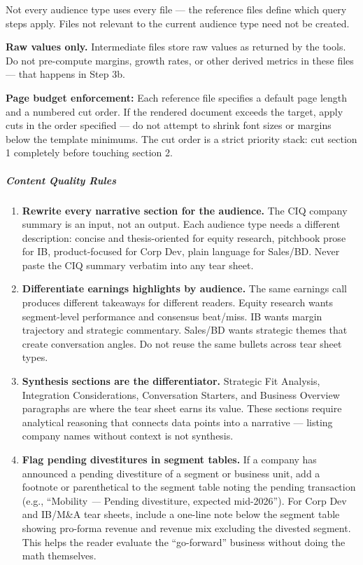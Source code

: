 \documentclass[11pt]{article}
\begin{document}
Not every audience type uses every file — the reference files define which query steps apply. Files not relevant to the current audience type need not be created.


\textbf{Raw values only.} Intermediate files store raw values as returned by the tools. Do not pre-compute margins, growth rates, or other derived metrics in these files — that happens in Step 3b.


\textbf{Page budget enforcement:} Each reference file specifies a default page length and a numbered cut order. If the rendered document exceeds the target, apply cuts in the order specified — do not attempt to shrink font sizes or margins below the template minimums. The cut order is a strict priority stack: cut section 1 completely before touching section 2.


\subparagraph{Content Quality Rules}\mbox{}\par

\begin{enumerate}[leftmargin=*,itemsep=2pt,topsep=2pt]
\item {} \textbf{Rewrite every narrative section for the audience.} The CIQ company summary is an input, not an output. Each audience type needs a different description: concise and thesis-oriented for equity research, pitchbook prose for IB, product-focused for Corp Dev, plain language for Sales/BD. Never paste the CIQ summary verbatim into any tear sheet.
\item {} \textbf{Differentiate earnings highlights by audience.} The same earnings call produces different takeaways for different readers. Equity research wants segment-level performance and consensus beat/miss. IB wants margin trajectory and strategic commentary. Sales/BD wants strategic themes that create conversation angles. Do not reuse the same bullets across tear sheet types.
\item {} \textbf{Synthesis sections are the differentiator.} Strategic Fit Analysis, Integration Considerations, Conversation Starters, and Business Overview paragraphs are where the tear sheet earns its value. These sections require analytical reasoning that connects data points into a narrative — listing company names without context is not synthesis.
\item {} \textbf{Flag pending divestitures in segment tables.} If a company has announced a pending divestiture of a segment or business unit, add a footnote or parenthetical to the segment table noting the pending transaction (e.g., ``Mobility\emph{ — }Pending divestiture, expected mid-2026''). For Corp Dev and IB/M\&A tear sheets, include a one-line note below the segment table showing pro-forma revenue and revenue mix excluding the divested segment. This helps the reader evaluate the ``go-forward'' business without doing the math themselves.
\end{enumerate}
\end{document}
